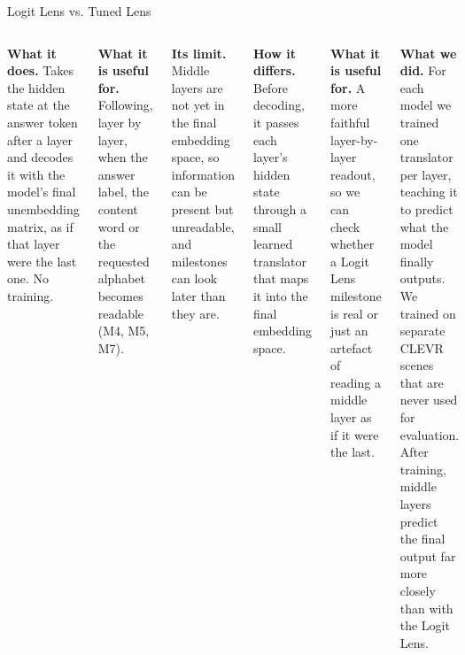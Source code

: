 \documentclass[aspectratio=169,12pt]{beamer}
\begin{document}
\begin{frame}{Logit Lens vs. Tuned Lens}
\begin{columns}[T,onlytextwidth]
\vspace{0.12cm}
\raggedright\fontsize{7.8}{9.6}\selectfont
\textbf{What it does.} Takes the hidden state at the answer token after a layer and decodes it with the model's final unembedding matrix, as if that layer were the last one. No training.

\vspace{0.12cm}
\textbf{What it is useful for.} Following, layer by layer, when the answer label, the content word or the requested alphabet becomes readable (M4, M5, M7).

\vspace{0.12cm}
\textbf{Its limit.} Middle layers are not yet in the final embedding space, so information can be present but unreadable, and milestones can look later than they are.
\centering{\color{Gold}\rule{0.4pt}{5.2cm}}
\vspace{0.12cm}
\raggedright\fontsize{7.8}{9.6}\selectfont
\textbf{How it differs.} Before decoding, it passes each layer's hidden state through a small learned translator that maps it into the final embedding space.

\vspace{0.12cm}
\textbf{What it is useful for.} A more faithful layer-by-layer readout, so we can check whether a Logit Lens milestone is real or just an artefact of reading a middle layer as if it were the last.

\vspace{0.12cm}
\textbf{What we did.} For each model we trained one translator per layer, teaching it to predict what the model finally outputs. We trained on separate CLEVR scenes that are never used for evaluation. After training, middle layers predict the final output far more closely than with the Logit Lens.
\end{columns}
\end{frame}
\end{document}
